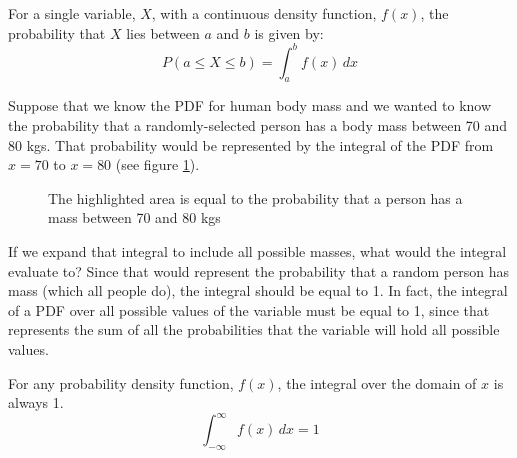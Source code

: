 \begin{mdframed}[style = important, frametitle = {Probability that $X$ lies 
between $a$ and $b$}]
For a single variable, $X$, with a continuous density function, $f(x)$, the 
probability that $X$ lies between $a$ and $b$ is given by:
$$P( a \leq X \leq b) = \int_a^b f(x)\,dx$$
\end{mdframed}

Suppose that we know the PDF for human body mass and we wanted to know the 
probability that a randomly-selected person has a body mass between 70 and 80 
kgs. That probability would be represented by the integral of the PDF from $x 
= 70$ to $x = 80$ (see figure \ref{fig:mass_PDF}). 

\begin{figure}[H]
    \centering
    \caption{The highlighted area is equal to the probability that a person 
    has a mass between 70 and 80 kgs}
    \label{fig:mass_PDF}
\end{figure}

If we expand that integral to include all possible masses, what would the 
integral evaluate to? Since that would represent the probability that a random 
person has mass (which all people do), the integral should be equal to 1. In 
fact, the integral of a PDF over all possible values of the variable must be 
equal to 1, since that represents the sum of all the probabilities that the 
variable will hold all possible values. 

\begin{mdframed}[style = important]
For any probability density function, $f(x)$, the integral over the domain of 
$x$ is always 1.
$$\int_{-\infty}^{\infty} f(x)\,dx = 1$$
\end{mdframed} 

